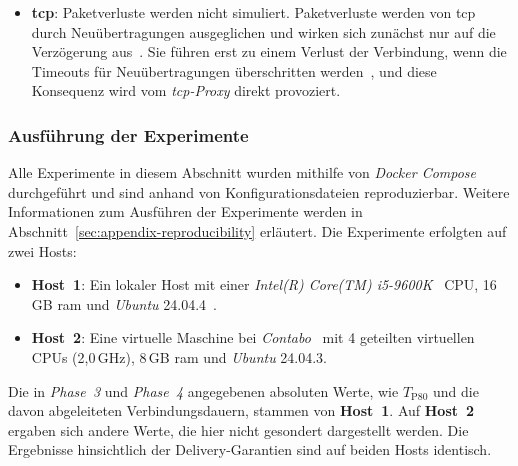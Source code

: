 \begin{itemize}
    \item \textbf{\gls{tcp}}: Paketverluste werden nicht simuliert. Paketverluste werden von \gls{tcp} durch Neuübertragungen ausgeglichen und wirken sich zunächst nur auf die Verzögerung aus~\citep{rfc9293, rfc6298}. Sie führen erst zu einem Verlust der Verbindung, wenn die Timeouts für Neuübertragungen überschritten werden~\citep{rfc9293, rfc1122}, und diese Konsequenz wird vom \textit{\gls{tcp}-Proxy} direkt provoziert.
\end{itemize}

\subsubsection{Ausführung der Experimente}
\label{sub-sub:exp-alps-execution}

Alle Experimente in diesem Abschnitt wurden mithilfe von \textit{Docker Compose}~\citep{docker_compose} durchgeführt und sind anhand von Konfigurationsdateien reproduzierbar. Weitere Informationen zum Ausführen der Experimente werden in Abschnitt~\ref{sec:appendix-reproducibility} erläutert. Die Experimente erfolgten auf zwei Hosts:

\begin{itemize}
    \item \textbf{Host~1}: Ein lokaler Host mit einer \textit{Intel(R) Core(TM) i5-9600K}~\citep{intel_i5_9600k} CPU, 16\,GB \gls{ram} und \textit{Ubuntu} 24.04.4~\citep{ubuntu_24_04}.
    \item \textbf{Host~2}: Eine virtuelle Maschine bei \textit{Contabo}~\citep{contabo} mit 4 geteilten virtuellen CPUs (2{,}0\,GHz), 8\,GB \gls{ram} und \textit{Ubuntu} 24.04.3.
\end{itemize}

Die in \textit{Phase~3} und \textit{Phase~4} angegebenen absoluten Werte, wie $T_{\text{P80}}$ und die davon abgeleiteten Verbindungsdauern, stammen von \textbf{Host~1}. Auf \textbf{Host~2} ergaben sich andere Werte, die hier nicht gesondert dargestellt werden. Die Ergebnisse hinsichtlich der Delivery-Garantien sind auf beiden Hosts identisch.